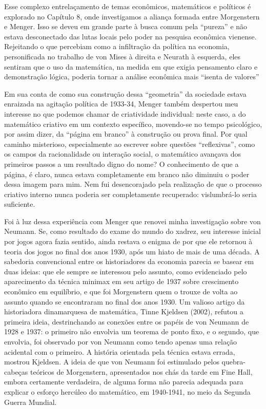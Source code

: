 \documentclass[a4paper,12pt]{article}[abntex2]
\begin{document}
Esse complexo entrelaçamento de temas econômicos, matemáticos e políticos é explorado no Capítulo 8, onde investigamos a aliança formada entre Morgenstern e Menger. Isso se deveu em grande parte à busca comum pela “pureza” e não estava desconectado das lutas locais pelo poder na pesquisa econômica vienense. Rejeitando o que percebiam como a infiltração da política na economia, personificada no trabalho de von Mises à direita e Neurath à esquerda, eles sentiram que o uso da matemática, na medida em que exigia pensamento claro e demonstração lógica, poderia tornar a análise econômica mais “isenta de valores”

Em sua conta de como sua construção dessa “geometria” da sociedade estava enraizada na agitação política de 1933-34, Menger também despertou meu interesse no que podemos chamar de criatividade individual: neste caso, a do matemático criativo em um contexto específico, movendo-se no tempo psicológico, por assim dizer, da “página em branco” à construção ou prova final. Por qual caminho misterioso, especialmente ao escrever sobre questões “reflexivas”, como os campos da racionalidade ou interação social, o matemático avançava dos primeiros passos a um resultado digno do nome? O conhecimento de que a página, é claro, nunca estava completamente em branco não diminuiu o poder dessa imagem para mim. Nem fui desencorajado pela realização de que o processo criativo interno nunca poderia ser completamente recuperado: vislumbrá-lo seria suficiente.

Foi à luz dessa experiência com Menger que renovei minha investigação sobre von Neumann. Se, como resultado do exame do mundo do xadrez, seu interesse inicial por jogos agora fazia sentido, ainda restava o enigma de por que ele retornou à teoria dos jogos no final dos anos 1930, após um hiato de mais de uma década. A sabedoria convencional entre os historiadores da economia parecia se basear em duas ideias: que ele sempre se interessou pelo assunto, como evidenciado pelo aparecimento da técnica minimax em seu artigo de 1937 sobre crescimento econômico em equilíbrio, e que foi Morgenstern quem o trouxe de volta ao assunto quando se encontraram no final dos anos 1930. Um valioso artigo da historiadora dinamarquesa de matemática, Tinne Kjeldsen (2002), refutou a primeira ideia, destrinchando as conexões entre os papéis de von Neumann de 1928 e 1937: o primeiro não envolvia um teorema de ponto fixo, e o segundo, que envolvia, foi observado por von Neumann como tendo apenas uma relação acidental com o primeiro. A história orientada pela técnica estava errada, mostrou Kjeldsen. A ideia de que von Neumann foi estimulado pelos quebra-cabeças teóricos de Morgenstern, apresentados nos chás da tarde em Fine Hall, embora certamente verdadeira, de alguma forma não parecia adequada para explicar o esforço hercúleo do matemático, em 1940-1941, no meio da Segunda Guerra Mundial.
\end{document}
